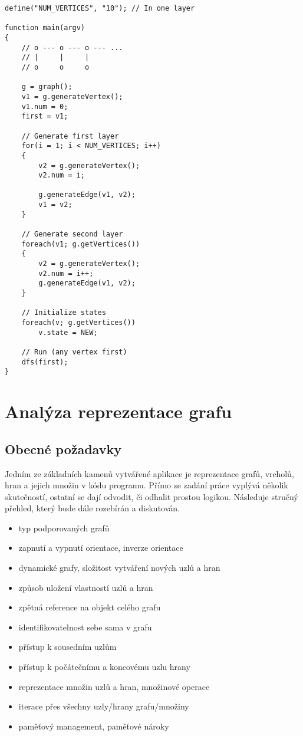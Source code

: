 \documentclass[11pt,twoside,a4paper]{book}
\begin{document}
\begin{verbatim}
define("NUM_VERTICES", "10"); // In one layer

function main(argv)
{
    // o --- o --- o --- ...
    // |     |     |
    // o     o     o

    g = graph();
    v1 = g.generateVertex();
    v1.num = 0;
    first = v1;

    // Generate first layer
    for(i = 1; i < NUM_VERTICES; i++)
    {
        v2 = g.generateVertex();
        v2.num = i;

        g.generateEdge(v1, v2);
        v1 = v2;
    }

    // Generate second layer
    foreach(v1; g.getVertices())
    {
        v2 = g.generateVertex();
        v2.num = i++;
        g.generateEdge(v1, v2);
    }

    // Initialize states
    foreach(v; g.getVertices())
        v.state = NEW;

    // Run (any vertex first)
    dfs(first);
}
\end{verbatim}


\section{Analýza reprezentace grafu}

\subsection{Obecné požadavky}

Jedním ze základních kamenů vytvářené aplikace je reprezentace grafů, vrcholů, hran a jejich množin v kódu programu. Přímo ze zadání práce vyplývá několik skutečností, ostatní se dají odvodit, či odhalit prostou logikou. Následuje stručný přehled, který bude dále rozebírán a diskutován.

\begin{itemize}
\item typ podporovaných grafů
\item zapnutí a vypnutí orientace, inverze orientace
\item dynamické grafy, složitost vytváření nových uzlů a hran
\item způsob uložení vlastností uzlů a hran
\item zpětná reference na objekt celého grafu
\item identifikovatelnost sebe sama v grafu
\item přístup k sousedním uzlům
\item přístup k počátečnímu a koncovému uzlu hrany
\item reprezentace množin uzlů a hran, množinové operace
\item iterace přes všechny uzly/hrany grafu/množiny
\item paměťový management, paměťové nároky
\end{itemize}
\end{document}
